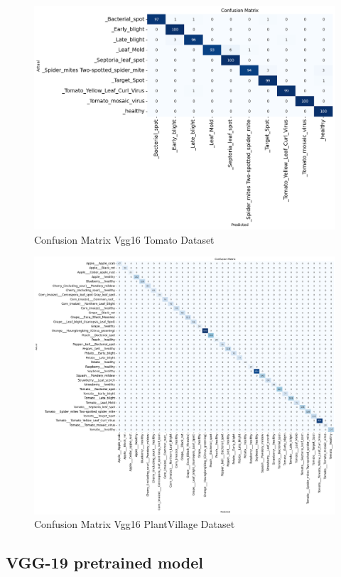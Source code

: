 \begin{figure}[H]
    \centering
    \includegraphics[width=1\textwidth]{chapters/chapter04/fig04/tomato ds_VGG16 cm.png}
    \caption{Confusion Matrix Vgg16 Tomato Dataset}
\end{figure}
\begin{figure}[H]
    \centering
    \includegraphics[width=1\textwidth]{chapters/chapter04/fig04/pv ds_VGG16 cm.png}
    \caption{Confusion Matrix Vgg16 PlantVillage Dataset}
\end{figure}
\subsection{VGG-19 pretrained model}
